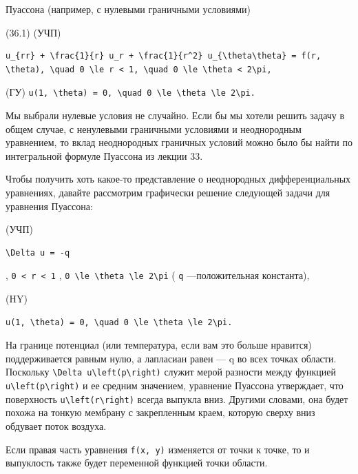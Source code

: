 \documentclass[
  ukrainian,
]{article}
\begin{document}
Пуассона (например, с нулевыми граничными условиями)

(36.1) (УЧП)

\begin{verbatim}
u_{rr} + \frac{1}{r} u_r + \frac{1}{r^2} u_{\theta\theta} = f(r, \theta), \quad 0 \le r < 1, \quad 0 \le \theta < 2\pi,
\end{verbatim}

(ГУ)
\texttt{u(1,\ \textbackslash{}theta)\ =\ 0,\ \textbackslash{}quad\ 0\ \textbackslash{}le\ \textbackslash{}theta\ \textbackslash{}le\ 2\textbackslash{}pi.}

Мы выбрали нулевые условия не случайно. Если бы мы хотели решить задачу
в общем случае, с ненулевыми граничными условиями и неоднородным
уравнением, то вклад неоднородных граничных условий можно было бы найти
по интегральной формуле Пуассона из лекции 33.

Чтобы получить хоть какое-то представление о неоднородных
дифференциальных уравнениях, давайте рассмотрим графически решение
следующей задачи для уравнения Пуассона:

(УЧП)

\begin{verbatim}
\Delta u = -q
\end{verbatim}

, \texttt{0\ \textless{}\ r\ \textless{}\ 1} ,
\texttt{0\ \textbackslash{}le\ \textbackslash{}theta\ \textbackslash{}le\ 2\textbackslash{}pi}
( \texttt{q} ---положительная константа),

(HY)

\begin{verbatim}
u(1, \theta) = 0, \quad 0 \le \theta \le 2\pi.
\end{verbatim}

На границе потенциал (или температура, если вам это больше нравится)
поддерживается равным нулю, а лапласиан равен --- q во всех точках
области. Поскольку
\texttt{\textbackslash{}Delta\ u\textbackslash{}left(p\textbackslash{}right)}
служит мерой разности между функцией
\texttt{u\textbackslash{}left(p\textbackslash{}right)} и ее средним
значением, уравнение Пуассона утверждает, что поверхность
\texttt{u\textbackslash{}left(r\textbackslash{}right)} всегда выпукла
вниз. Другими словами, она будет похожа на тонкую мембрану с
закрепленным краем, которую сверху вниз обдувает поток воздуха.

Если правая часть уравнения \texttt{f(x,\ y)} изменяется от точки к
точке, то и выпуклость также будет переменной функцией точки области.
\end{document}
